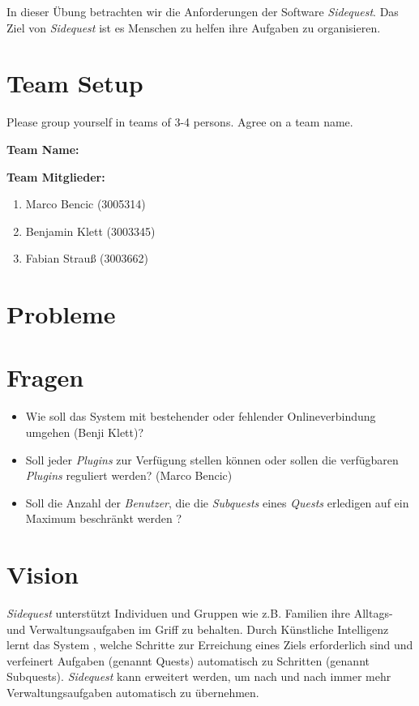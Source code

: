 \documentclass{article}
\begin{document}
\thispagestyle{page1} 
In dieser Übung betrachten wir die Anforderungen der Software \textit{Sidequest}. Das Ziel von \textit{Sidequest} ist es Menschen zu helfen ihre Aufgaben zu organisieren.


\section{Team Setup}

Please group yourself in teams of 3-4 persons. Agree on a team name. 

\textbf{Team Name:} \teamname

\textbf{Team Mitglieder:}
\begin{enumerate}
\item Marco Bencic (3005314)
\item Benjamin Klett (3003345)
\item Fabian Strauß (3003662)
\end{enumerate}

\section{Probleme}

\section{Fragen}

\begin{itemize}
	\item Wie soll das System mit bestehender oder fehlender Onlineverbindung umgehen (Benji Klett)?
    \item Soll jeder \textit{Plugins} zur Verfügung stellen können oder sollen die verfügbaren \textit{Plugins} reguliert werden? (Marco Bencic)
    \item Soll die Anzahl der \textit{Benutzer}, die die \textit{Subquests} eines \textit{Quests} erledigen auf ein Maximum beschränkt werden ?
\end{itemize}

\section{Vision}

\textit{Sidequest} unterstützt Individuen und Gruppen wie z.B. Familien ihre Alltags- und Verwaltungsaufgaben im Griff zu behalten. Durch Künstliche Intelligenz lernt das System , welche Schritte zur Erreichung eines Ziels erforderlich sind und verfeinert Aufgaben (genannt Quests) automatisch zu Schritten (genannt Subquests). \textit{Sidequest} kann erweitert werden, um nach und nach immer mehr Verwaltungsaufgaben automatisch zu übernehmen. 
\end{document}
